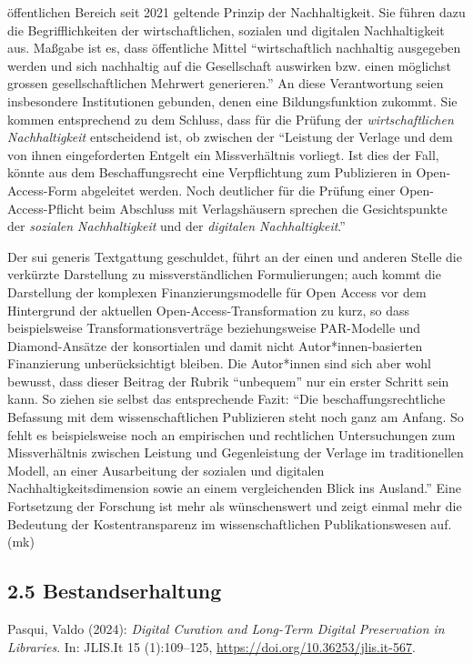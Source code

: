 \documentclass[a4paper,
fontsize=11pt,
oneside,
numbers=noperiodatend,
parskip=half-,
bibliography=totoc,
final
]{scrartcl}
\begin{document}
öffentlichen Bereich seit 2021 geltende Prinzip der Nachhaltigkeit. Sie
führen dazu die Begrifflichkeiten der wirtschaftlichen, sozialen und
digitalen Nachhaltigkeit aus. Maßgabe ist es, dass öffentliche Mittel
``wirtschaftlich nachhaltig ausgegeben werden und sich nachhaltig auf
die Gesellschaft auswirken bzw. einen möglichst grossen
gesellschaftlichen Mehrwert generieren.'' An diese Verantwortung seien
insbesondere Institutionen gebunden, denen eine Bildungsfunktion
zukommt. Sie kommen entsprechend zu dem Schluss, dass für die Prüfung
der \emph{wirtschaftlichen Nachhaltigkeit} entscheidend ist, ob zwischen
der ``Leistung der Verlage und dem von ihnen eingeforderten Entgelt ein
Missverhältnis vorliegt. Ist dies der Fall, könnte aus dem
Beschaffungsrecht eine Verpflichtung zum Publizieren in Open-Access-Form
abgeleitet werden. Noch deutlicher für die Prüfung einer
Open-Access-Pflicht beim Abschluss mit Verlagshäusern sprechen die
Gesichtspunkte der \emph{sozialen Nachhaltigkeit} und der
\emph{digitalen Nachhaltigkeit}.''

Der sui generis Textgattung geschuldet, führt an der einen und anderen
Stelle die verkürzte Darstellung zu missverständlichen Formulierungen;
auch kommt die Darstellung der komplexen Finanzierungsmodelle für Open
Access vor dem Hintergrund der aktuellen Open-Access-Transformation zu
kurz, so dass beispielsweise Transformationsverträge beziehungsweise
PAR-Modelle und Diamond-Ansätze der konsortialen und damit nicht
Autor*innen-basierten Finanzierung unberücksichtigt bleiben. Die
Autor*innen sind sich aber wohl bewusst, dass dieser Beitrag der Rubrik
``unbequem'' nur ein erster Schritt sein kann. So ziehen sie selbst das
entsprechende Fazit: ``Die beschaffungsrechtliche Befassung mit dem
wissenschaftlichen Publizieren steht noch ganz am Anfang. So fehlt es
beispielsweise noch an empirischen und rechtlichen Untersuchungen zum
Missverhältnis zwischen Leistung und Gegenleistung der Verlage im
traditionellen Modell, an einer Ausarbeitung der sozialen und digitalen
Nachhaltigkeitsdimension sowie an einem vergleichenden Blick ins
Ausland.'' Eine Fortsetzung der Forschung ist mehr als wünschenswert und
zeigt einmal mehr die Bedeutung der Kostentransparenz im
wissenschaftlichen Publikationswesen auf. (mk)

\subsection{2.5 Bestandserhaltung}\label{bestandserhaltung}

Pasqui, Valdo (2024): \emph{Digital Curation and Long-Term Digital
Preservation in Libraries}. In: JLIS.It 15 (1):109--125,
\url{https://doi.org/10.36253/jlis.it-567}.
\end{document}
